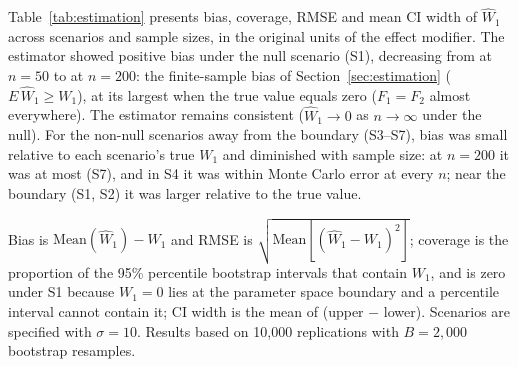 \documentclass[AMA,Times1COL]{WileyNJDv5}
\begin{document}
Table~\ref{tab:estimation} presents bias, coverage, RMSE and mean CI width of $\widehat{W}_1$ across scenarios and sample sizes, in the original units of the effect modifier. The estimator showed positive bias under the null scenario (S1), decreasing from  at $n=50$ to  at $n=200$: the finite-sample bias of Section~\ref{sec:estimation} ($E\,\widehat{W}_1 \geq W_1$), at its largest when the true value equals zero ($F_1 = F_2$ almost everywhere). The estimator remains consistent ($\widehat{W}_1 \to 0$ as $n \to \infty$ under the null). For the non-null scenarios away from the boundary (S3--S7), bias was small relative to each scenario's true $W_1$ and diminished with sample size: at $n = 200$ it was at most  (S7), and in S4 it was within Monte Carlo error at every $n$; near the boundary (S1, S2) it was larger relative to the true value.

\begin{table}[ht]
\centering
\caption{Bias, coverage of the 95\% percentile bootstrap confidence interval, RMSE and mean CI width of $\widehat{W}_1$ by scenario and sample size, in the original units of the effect modifier.\label{tab:estimation}}
\begin{tablenotes}
\item Bias is $\text{Mean}(\widehat{W}_1) - W_1$ and RMSE is $\sqrt{\text{Mean}[(\widehat{W}_1 - W_1)^2]}$; coverage is the proportion of the 95\% percentile bootstrap intervals that contain $W_1$, and is zero under S1 because $W_1 = 0$ lies at the parameter space boundary and a percentile interval cannot contain it; CI width is the mean of (upper $-$ lower). Scenarios are specified with $\sigma = 10$. Results based on 10{,}000 replications with $B = 2{,}000$ bootstrap resamples.
\end{tablenotes}
\end{table}
\end{document}
